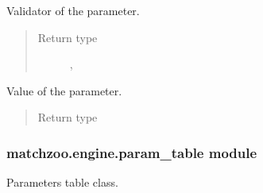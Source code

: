 \documentclass[letterpaper,10pt,english]{sphinxmanual}
\begin{document}
\begin{fulllineitems}
\begin{fulllineitems}
\begin{quote}
\begin{description}
\end{description}\end{quote}

\end{fulllineitems}


\begin{fulllineitems}
\label{\detokenize{matchzoo.engine:matchzoo.engine.param.Param.validator}}
 \textendash{} Validator of the parameter.
\begin{quote}\begin{description}
\item[{Return type}] \leavevmode
\sphinxcode{\sphinxupquote{Callable}}{[}{[}\sphinxcode{\sphinxupquote{Any}}{]}, \sphinxcode{\sphinxupquote{bool}}{]}

\end{description}\end{quote}

\end{fulllineitems}


\begin{fulllineitems}
\label{\detokenize{matchzoo.engine:matchzoo.engine.param.Param.value}}
 \textendash{} Value of the parameter.
\begin{quote}\begin{description}
\item[{Return type}] \leavevmode
{}

\end{description}\end{quote}

\end{fulllineitems}


\end{fulllineitems}



\subsubsection{matchzoo.engine.param\_table module}
\label{\detokenize{matchzoo.engine:matchzoo-engine-param-table-module}}\label{\detokenize{matchzoo.engine:module-matchzoo.engine.param_table}}
Parameters table class.
\end{document}
